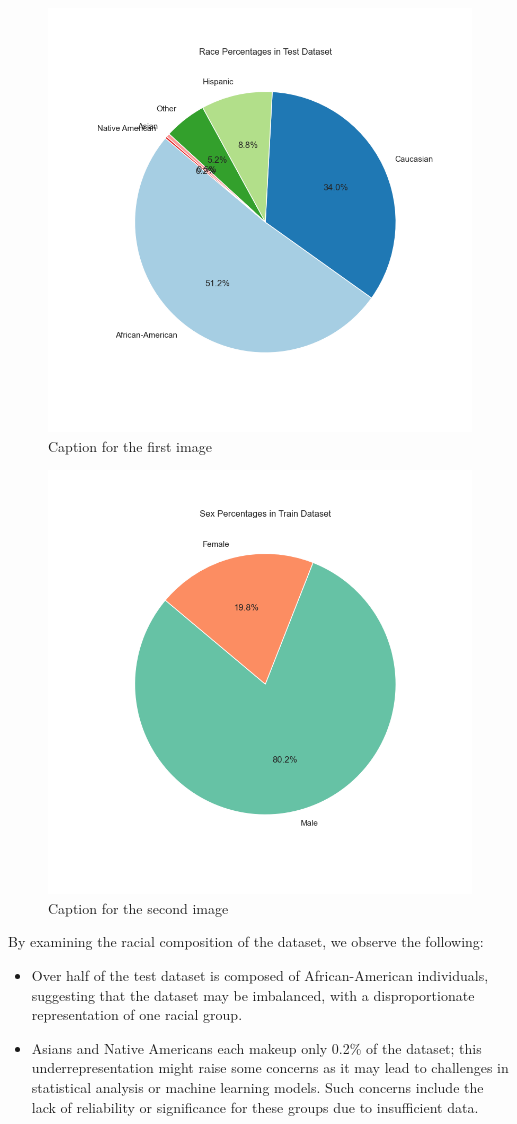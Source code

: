 \begin{figure}
	\centering
	\includegraphics[width=0.7\linewidth]{img/race_percentages_pie.png}
	\caption{Caption for the first image}
	\label{fig:image1}
\end{figure}
\hfill
\begin{figure}
	\centering
	\includegraphics[width=0.7\linewidth]{img/sex_percentages_pie.png}
	\caption{Caption for the second image}
	\label{fig:image2}
\end{figure}


By examining the racial composition of the dataset, we observe the following:

\begin{itemize}
	\item Over half of the test dataset is composed of African-American individuals, suggesting that the dataset may be imbalanced, with a disproportionate representation of one racial group.
	\item Asians and Native Americans each makeup only 0.2\% of the dataset; this underrepresentation might raise some concerns as it may lead to challenges in statistical analysis or machine learning models. Such concerns include the lack of reliability or significance for these groups due to insufficient data.
\end{itemize}

